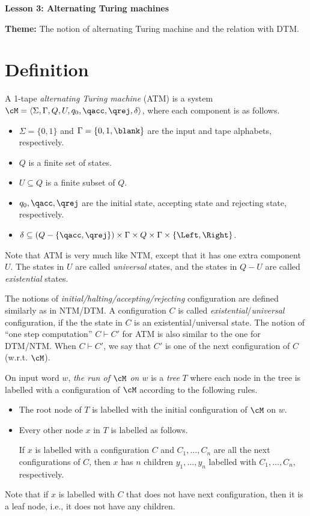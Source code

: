 \documentclass[11pt, a4paper]{article}
\renewcommand{\lesson}{3}
\renewcommand{\lessontitle}{Alternating Turing machines}
\renewcommand{\fulltitle}{Lesson \lesson: \lessontitle}
\begin{document}
\date{}



\begin{center}
{\Large {\bf \fulltitle}}
\end{center}
\vspace{0.5cm}

\noindent
{\bf Theme:} The notion of alternating Turing machine and the relation with DTM.



\section{Definition}
\label{sec:def-atm}

A 1-tape {\em alternating Turing machine} (ATM) is a system
$\cM =\langle \Sigma,\Gamma, Q,U,q_0,\qacc,\qrej,\delta\rangle$,
where each component is as follows.
\begin{itemize}
\item
$\Sigma =\{0,1\}$ and $\Gamma=\{0,1,\blank\}$
are the input and tape alphabets, respectively.
\item
$Q$ is a finite set of states.
\item
$U\subseteq Q$ is a finite subset of $Q$.
\item
$q_0,\qacc,\qrej$ are the initial state, accepting state and rejecting state, respectively.
\item
$\delta \subseteq (Q- \{\qacc,\qrej\})\times \Gamma \times Q\times \Gamma\times \{\Left,\Right\}$. 
\end{itemize}
Note that ATM is very much like NTM, except that it has one extra component $U$.
The states in $U$ are called {\em universal} states,
and the states in $Q- U$ are called {\em existential} states.

The notions of {\em initial/halting/accepting/rejecting} configuration are defined similarly as in NTM/DTM.
A configuration $C$ is called {\em existential}/{\em universal} configuration,
if the the state in $C$ is an existential/universal state.
The notion of ``one step computation'' $C\vdash C'$ for ATM is also similar to the one for DTM/NTM.
When $C\vdash C'$, we say that $C'$ is one of the next configuration of $C$ (w.r.t. $\cM$).

On input word $w$, {\em the run of $\cM$ on $w$} is a {\em tree} $T$ where each node in the tree is labelled with a configuration of $\cM$
according to the following rules.
\begin{itemize}
\item
The root node of $T$ is labelled with the initial configuration of $\cM$ on $w$.
\item
Every other node $x$ in $T$ is labelled as follows.

If $x$ is labelled with a configuration $C$
and $C_1,\ldots,C_n$ are all the next configurations of $C$,
then $x$ has $n$ children $y_1,\ldots,y_n$ labelled with $C_1,\ldots,C_n$, respectively.
\end{itemize}
Note that if $x$ is labelled with $C$ that does not have next configuration, 
then it is a leaf node, i.e., it does not have any children.
\end{document}
